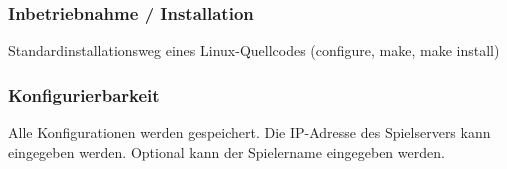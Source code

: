\subsubsection{Inbetriebnahme / Installation}
Standardinstallationsweg eines Linux-Quellcodes (configure, make, make install)

\subsubsection{Konfigurierbarkeit}
Alle Konfigurationen werden gespeichert. Die IP-Adresse des Spielservers kann eingegeben werden.
Optional kann der Spielername eingegeben werden.





